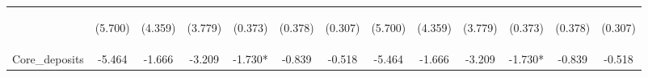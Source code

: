 \documentclass[]{article}
\begin{document}
\begin{center}
\begin{tabular}{lcccccccccccc}
\vspace{4pt} & \begin{footnotesize}(5.700)\end{footnotesize} & \begin{footnotesize}(4.359)\end{footnotesize} & \begin{footnotesize}(3.779)\end{footnotesize} & \begin{footnotesize}(0.373)\end{footnotesize} & \begin{footnotesize}(0.378)\end{footnotesize} & \begin{footnotesize}(0.307)\end{footnotesize} & \begin{footnotesize}(5.700)\end{footnotesize} & \begin{footnotesize}(4.359)\end{footnotesize} & \begin{footnotesize}(3.779)\end{footnotesize} & \begin{footnotesize}(0.373)\end{footnotesize} & \begin{footnotesize}(0.378)\end{footnotesize} & \begin{footnotesize}(0.307)\end{footnotesize} \\
Core\_deposits & -5.464 & -1.666 & -3.209 & -1.730* & -0.839 & -0.518 & -5.464 & -1.666 & -3.209 & -1.730* & -0.839 & -0.518 \\

\end{tabular}
\end{center}
\end{document}
